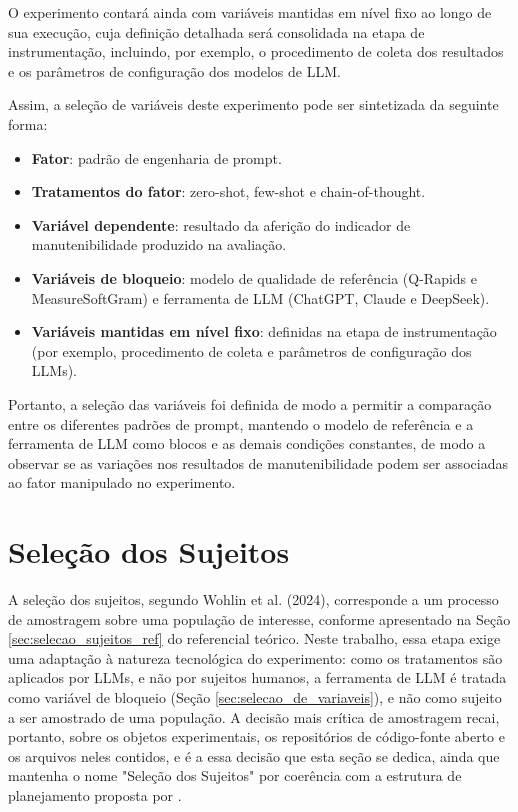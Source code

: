 O experimento contará ainda com variáveis mantidas em nível fixo ao longo de sua execução, cuja definição detalhada será consolidada na etapa de instrumentação, incluindo, por exemplo, o procedimento de coleta dos resultados e os parâmetros de configuração dos modelos de LLM.

Assim, a seleção de variáveis deste experimento pode ser sintetizada da seguinte forma:

\begin{itemize}
    \item \textbf{Fator}: padrão de engenharia de prompt.
    \item \textbf{Tratamentos do fator}: zero-shot, few-shot e chain-of-thought.
    \item \textbf{Variável dependente}: resultado da aferição do
    indicador de manutenibilidade produzido na avaliação.
    \item \textbf{Variáveis de bloqueio}: modelo de qualidade de
    referência (Q-Rapids e MeasureSoftGram) e ferramenta de
    LLM (ChatGPT, Claude e DeepSeek).
    \item \textbf{Variáveis mantidas em nível fixo}: definidas na etapa
    de instrumentação (por exemplo, procedimento de coleta e parâmetros
    de configuração dos LLMs).
\end{itemize}

Portanto, a seleção das variáveis foi definida de modo a permitir a comparação entre os diferentes padrões de prompt, mantendo o modelo de referência e a ferramenta de LLM como blocos e as demais condições constantes, de modo a observar se as variações nos resultados de manutenibilidade podem ser associadas ao fator manipulado no experimento.

\section{Seleção dos Sujeitos}
\label{sec:sujeitos}

A seleção dos sujeitos, segundo Wohlin et al. (2024), corresponde a um processo de amostragem sobre uma população de interesse, conforme apresentado na Seção \ref{sec:selecao_sujeitos_ref} do referencial teórico. Neste trabalho, essa etapa exige uma adaptação à natureza tecnológica do experimento: como os tratamentos são aplicados por LLMs, e não por sujeitos humanos, a ferramenta de LLM é tratada como variável de bloqueio (Seção \ref{sec:selecao_de_variaveis}), e não como sujeito a ser amostrado de uma população. A decisão mais crítica de amostragem recai, portanto, sobre os objetos experimentais, os repositórios de código-fonte aberto e os arquivos neles contidos, e é a essa decisão que esta seção se dedica, ainda que mantenha o nome "Seleção dos Sujeitos" por coerência com a estrutura de planejamento proposta por .

